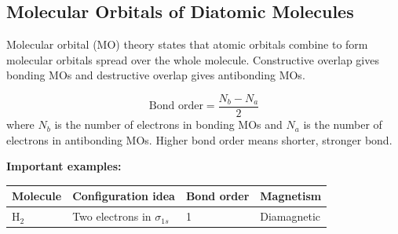 \documentclass[12pt,a4paper]{article}
\begin{document}
\begin{tcolorbox}[tikzbox, title={Particle in a Box: Quantized Standing Waves}]
\centering
{}
\end{tcolorbox}

\subsection{Molecular Orbitals of Diatomic Molecules}
Molecular orbital (MO) theory states that atomic orbitals combine to form molecular orbitals spread over the whole molecule. Constructive overlap gives bonding MOs and destructive overlap gives antibonding MOs.

\begin{tcolorbox}[formulabox, title={Bond Order}]
\[
\text{Bond order}=\frac{N_b-N_a}{2}
\]
where $N_b$ is the number of electrons in bonding MOs and $N_a$ is the number of electrons in antibonding MOs. Higher bond order means shorter, stronger bond.
\end{tcolorbox}

\textbf{Important examples:}\par\noindent
\begin{tabularx}{\linewidth}{|B{2.8cm}|Y|Y|Y|}
\hline
\textbf{Molecule} & \textbf{Configuration idea} & \textbf{Bond order} & \textbf{Magnetism} \\
\hline
$\mathrm{H_2}$ & Two electrons in $\sigma_{1s}$ & 1 & Diamagnetic \\
\hline
\hline
\end{tabularx}
\end{document}

